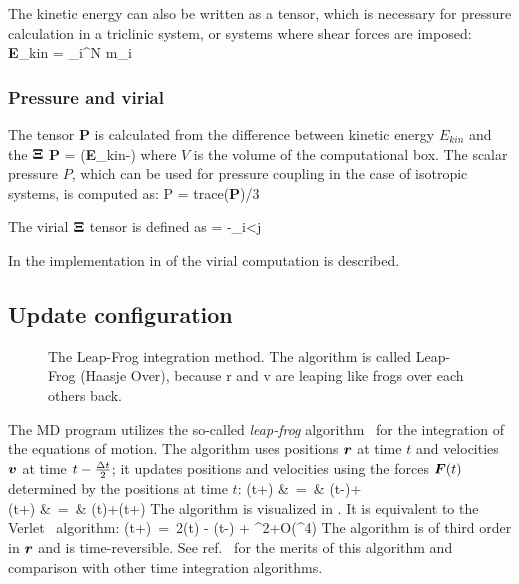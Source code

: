 The kinetic energy can also be written as a tensor, which is necessary
for pressure calculation in a triclinic system, or systems where shear
forces  are imposed:
\beq
{\bf E}_{kin} = \half \sum_i^N m_i \vvi \otimes \vvi
\eeq

\subsubsection{Pressure and virial}
The  
tensor {\bf P} is calculated from the difference between 
kinetic energy $E_{kin}$ and the  ${\bf \Xi}$
\beq
{\bf P} =  ({\bf E}_{kin}-{\bf \Xi})
\label{eqn:P}
\eeq
where $V$ is the volume of the computational box. 
The scalar pressure $P$, which can be used for pressure coupling in the case
of isotropic systems, is computed as:
\beq
P       = {\rm trace}({\bf P})/3
\eeq

The virial ${\bf \Xi}$ tensor is defined as 
\beq
{\bf \Xi} = -\half \sum_{i<j} \rvij \otimes \Fvij 
\eeq

In  the
implementation  in {\gromacs} of the virial computation is described.

\subsection{Update configuration}
\label{subsec:update}
\begin{figure}
\centerline{}
\caption[The Leap-Frog integration method.]{The Leap-Frog integration method. The algorithm is called
Leap-Frog  (Haasje Over), because r and v are leaping
like  frogs over each others back.}
\label{fig:leapfrog}
\end{figure}

The {\gromacs} MD program utilizes the so-called {\em leap-frog} 
algorithm~\cite{Hockney74} for the integration of the equations of
motion.  The  
algorithm uses positions $\mbox{\boldmath ${r}$}$ at time $t$ and
velocities $\mbox{\boldmath ${v}$}$ at time $t-{\frac {\Delta t}{2}}$; it updates positions and
velocities using the forces
$\mbox{\boldmath ${F}$}(t)$ determined by the positions at time $t$: 
\bea
{}(t+\hDt)  &~=~&   (t-\hDt)+\Dt   \\
(t+\Dt)   &~=~&   (t)+(t+\hDt)\Dt
\eea
The algorithm is visualized in .
It is equivalent to the Verlet~\cite{Verlet67} algorithm:
\beq
{}(t+\Dt)~=~2(t) - (t-\Dt) + \Dt^2+O(\Dt^4)
\eeq
The algorithm is of third order in $\mbox{\boldmath ${r}$}$ and is time-reversible.
See ref.~\cite{Berendsen86b} for the merits of this algorithm and comparison
with other time integration algorithms.
 
